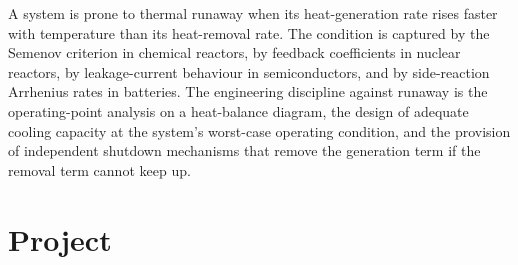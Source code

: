 \begin{principle}
A system is prone to thermal runaway when its heat-generation rate
rises faster with temperature than its heat-removal rate. The
condition is captured by the Semenov criterion in chemical reactors,
by feedback coefficients in nuclear reactors, by leakage-current
behaviour in semiconductors, and by side-reaction Arrhenius rates in
batteries. The engineering discipline against runaway is the
operating-point analysis on a heat-balance diagram, the design of
adequate cooling capacity at the system's worst-case operating
condition, and the provision of independent shutdown mechanisms that
remove the generation term if the removal term cannot keep up.
\end{principle}

\section{Project}

